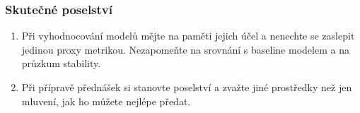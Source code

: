 \documentclass[bigger]{beamer}
\begin{document}
\begin{frame}
\frametitle{Skutečné poselství}


\begin{enumerate}
\item Při vyhodnocování modelů mějte na paměti jejich účel a nenechte se
zaslepit jedinou proxy metrikou. Nezapomeňte na srovnání s baseline modelem a
na průzkum stability.
\bigskip
\item Při přípravě přednášek si stanovte poselství a zvažte jiné prostředky než
jen mluvení, jak ho můžete nejlépe předat.
\end{enumerate}
\end{frame}
\end{document}
